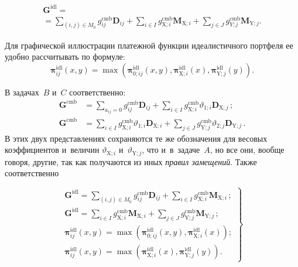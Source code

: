 \begin{multicols}{2}
{}

\noindent
\begin{multline*}
  \boldsymbol{G}^{\mathrm{idl}}={}\\
  {}=\sum\limits_{(i,j)\in M_0} g_{ij}^{\mathrm{cmb}} 
\boldsymbol{D}_{ij} +\sum\limits_{i\in I} 
g_{\mathrm{X};i}^{\mathrm{cmb}}\boldsymbol{M}_{\mathrm{X};i}+\sum\limits_{j\in J} 
g^{\mathrm{cmb}}_{Y;j}\boldsymbol{M}_{\mathrm{Y};j}.
  \end{multline*}
  
  Для графической иллюстрации платежной функции идеалистичного 
портфеля ее удобно рассчитывать по формуле:
  \begin{equation}
  \boldsymbol{\pi}_{ij}^{\mathrm{idl}}(x,y)=\max \left( \boldsymbol{\pi}_{0;ij}^{\mathrm{idl}} (x,y), 
\boldsymbol{\pi}_{\mathrm{X};i}^{\mathrm{idl}}(x), 
\boldsymbol{\pi}_{\mathrm{Y};j}^{\mathrm{idl}}(y)\right).\!\!
  \label{e15-ags}
  \end{equation}
  
  В задачах~$B$ и~$C$ соответственно: 
  \begin{align*}
  \boldsymbol{G}^{\mathrm{cmb}} &= \sum\limits_{a_{ij}=0} 
g_{ij}^{\mathrm{cmb}}\boldsymbol{D}_{ij} + \sum\limits_{i\in I} 
g^{\mathrm{cmb}}_{\mathrm{X};i}\vartheta_{1;i} \boldsymbol{D}_{\mathrm{X};j}\,;\\
  \boldsymbol{G}^{\mathrm{cmb}} &= \sum\limits_{i\in I} 
g_{\mathrm{X};i}^{\mathrm{cmb}}\vartheta_{1;i}\boldsymbol{D}_{\mathrm{X};i} + 
\sum\limits_{j\in J} g^{\mathrm{cmb}}_{\mathrm{Y};j}\vartheta_{2;j} 
\boldsymbol{D}_{\mathrm{Y};j}\,.
  \end{align*}
   В этих двух представлениях сохраняются те же обозначения для весовых коэффициентов 
   и~величин $\vartheta_{\mathrm{X};i}$ и~$\vartheta_{\mathrm{Y};j}$, что и~в~задаче~$A$, но все они, 
вообще говоря, другие, так как получаются из иных \textit{правил замещений}. Также соответственно 

\noindent
  \begin{equation}
  \left.
  \begin{array}{l}
  \boldsymbol{G}^{\mathrm{idl}}=\displaystyle\sum\limits_{(i,j)\in M_0} 
g_{ij}^{\mathrm{cmb}}\boldsymbol{D}_{ij} +
\displaystyle\sum\limits_{i\in I} g^{\mathrm{cmb}}_{\mathrm{X};i} 
\boldsymbol{M}_{\mathrm{X};i}\,;\\[12pt]
  \boldsymbol{G}^{\mathrm{idl}}=\displaystyle \sum\limits_{i\in I} 
g_{\mathrm{X};i}^{\mathrm{cmb}}\boldsymbol{M}_{\mathrm{X};i} +\sum\limits_{j\in J} 
g^{\mathrm{cmb}}_{\mathrm{Y};j} \boldsymbol{M}_{\mathrm{Y};j}\,;\\[12pt]
  \boldsymbol{\pi}_{ij}^{\mathrm{idl}}(x,y)=\max\left( \boldsymbol{\pi}_{0;ij}^{\mathrm{idl}} (x,y), 
\boldsymbol{\pi}^{\mathrm{idl}}_{\mathrm{X};i}(x)\right);\\[9pt]
  \boldsymbol{\pi}_{ij}^{\mathrm{idl}}(x,y)=\max\left( 
\boldsymbol{\pi}_{\mathrm{X};i}^{\mathrm{idl}} (x), 
\boldsymbol{\pi}^{\mathrm{idl}}_{\mathrm{Y};j}(y)\right).
  \end{array}
  \right\}
  \label{e16-ags}
  \end{equation}
  

\end{multicols}
